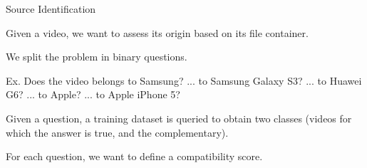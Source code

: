 \begin{tframe}{Source Identification}

\vspace{0.1cm}

Given a video, we want to assess its origin based on its file container.

\vspace{0.5cm}

We split the problem in binary questions.

\vspace{0.5cm}

Ex. Does the video belongs to Samsung? \newline
	 ... to Samsung Galaxy S3? \newline
	 ... to Huawei G6? \newline
	 ... to Apple? \newline
	 ... to Apple iPhone 5? \newline
	 
\vspace{0.1cm}

Given a question, a training dataset is queried to obtain two classes (videos for which the answer is true, and the complementary).

\vspace{0.5cm}

For each question, we want to define a compatibility score.

\end{tframe}

